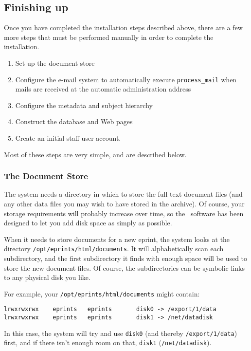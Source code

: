 \subsection{Finishing up}
\label{finishing_up}

Once you have completed the installation steps described above, there are a few more steps that must be performed manually in order to complete the installation.

\begin{enumerate}
\item Set up the document store
\item Configure the e-mail system to automatically execute {\tt process\_mail} when mails are received at the automatic administration address
\item Configure the metadata and subject hierarchy
\item Construct the database and Web pages
\item Create an initial staff user account.
\end{enumerate}

Most of these steps are very simple, and are described below.


\subsubsection{The Document Store}

The system needs a directory in which to store the full text document files (and any other data files you may wish to have stored in the archive). Of course, your storage requirements will probably increase over time, so the \eprints\ software has been designed to let you add disk space as simply as possible.

When it needs to store documents for a new eprint, the system looks at the directory {\tt /opt/eprints/html/documents}. It will alphabetically scan each subdirectory, and the first subdirectory it finds with enough space will be used to store the new document files. Of course, the subdirectories can be symbolic links to any physical disk you like.

For example, your {\tt /opt/eprints/html/documents} might contain:

\begin{verbatim}
lrwxrwxrwx    eprints   eprints       disk0 -> /export/1/data
lrwxrwxrwx    eprints   eprints       disk1 -> /net/datadisk
\end{verbatim}

In this case, the system will try and use {\tt disk0} (and thereby {\tt /export/1/data}) first, and if there isn't enough room on that, {\tt disk1} ({\tt /net/datadisk}).

